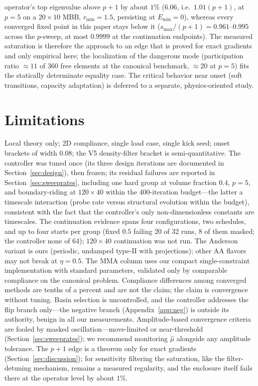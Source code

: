 \documentclass[11pt,a4paper]{article}
\newcommand{\smax}{s_{\max}}
\newcommand{\muh}{\hat{\mu}}
\begin{document}
operator's top eigenvalue above $p{+}1$ by about $1\%$ ($6.06$, i.e.\
$1.01(p{+}1)$, at $p=5$ on a $20\times10$ MBB, $r_{\min}=1.5$,
persisting at $E_{\min}=0$),
whereas every converged fixed point in this paper stays below it
($\smax/(p{+}1)=0.961$--$0.995$ across the $p$-sweep, at most $0.9999$
at the continuation endpoints). The measured saturation is therefore
the approach to an edge that is proved for exact gradients and only
empirical here; the localization of the dangerous mode (participation
ratio $\approx11$ of 360 free elements at the canonical benchmark,
$\approx20$ at $p=5$) fits the statically determinate equality case.
The critical behavior near onset (soft transitions, capacity adaptation)
is deferred to a separate, physics-oriented study.

\section{Limitations}\label{sec:limits}

Local theory only; 2D compliance, single load case, single kick seed;
onset brackets of width $0.08$; the V5 density-filter bracket is
semi-quantitative. The controller was tuned once (its three design
iterations are documented in Section~\ref{sec:design}), then frozen;
its residual failures are reported in Section~\ref{sec:sweeprates},
including one hard group at volume fraction $0.4$, $p=5$, and
boundary-riding at $120\times40$ within the 400-iteration budget---the
latter a timescale interaction (probe rate versus structural evolution
within the budget), consistent with the fact that the controller's only
non-dimensionless constants are timescales. The continuation evidence
spans four configurations, two schedules, and up to four starts per
group (fixed $0.5$ failing 20 of 32 runs, 8 of them masked; the
controller none of 64);
$120\times40$ continuation was not run. The Anderson variant is ours (periodic, undamped
type-II with projections); other AA flavors may not break at
$\eta=0.5$. The MMA column uses our compact single-constraint
implementation with standard parameters, validated only by comparable
compliance on the canonical problem. Compliance differences among
converged methods are tenths of a percent and are not the claim; the
claim is convergence without tuning. Basin selection is uncontrolled,
and the controller addresses the flip branch only---the negative branch
(Appendix~\ref{app:neg}) is outside its authority, benign in all our
measurements. Amplitude-based convergence criteria are fooled by
masked oscillation---move-limited or near-threshold
(Section~\ref{sec:sweeprates}); we recommend monitoring $\muh$
alongside any amplitude tolerance.
The $p{+}1$ edge is a theorem only for exact gradients
(Section~\ref{sec:discussion}); for sensitivity filtering the
saturation, like the filter-detuning mechanism, remains a measured
regularity, and the enclosure itself fails there at the operator level
by about $1\%$.
\end{document}

